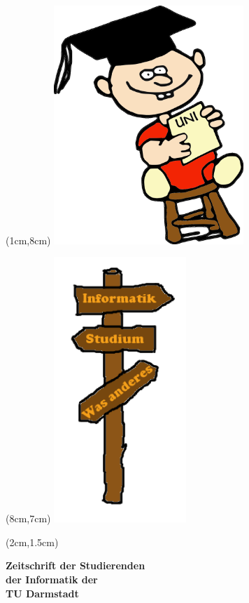 \begin{titlepage}~


    \begin{textblock*}{12cm}(1cm,8cm)
        \includegraphics[height=9cm]{../grafik/wesen/wesen_uni}
    \end{textblock*}

    \begin{textblock*}{10cm}(8cm,7cm)
        \includegraphics[height=10cm]{../grafik/schild}
    \end{textblock*}


    \begin{textblock*}{12cm}(2cm,1.5cm)
        \begin{flushleft}
            \large\sffamily\textbf{
                \newline
                Zeitschrift der Studierenden\\
                der Informatik der \\
                TU Darmstadt}
        \end{flushleft}
    \end{textblock*}



\end{titlepage}
